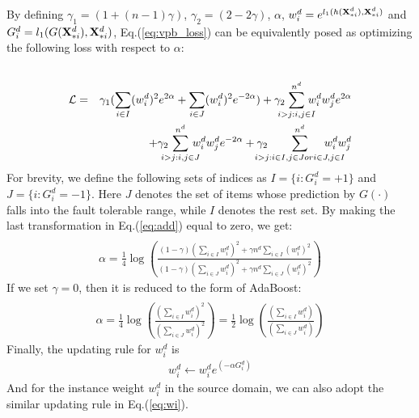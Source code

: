 By defining $\gamma_1=(1+(n-1)\gamma)$, $\gamma_2=(2-2\gamma)$, $\alpha$,
 $w_i^d=e^{l_1(h(\mathbf{X}^d_{*i}),\mathbf{X}^d_{*i})}$ and $G_i^d=l_1(G(\mathbf{X}^d_{*i}),\mathbf{X}^d_{*i})$, Eq.(\ref{eq:vpb_loss}) can be equivalently posed as optimizing the following loss with respect to $\alpha$:
\begin{eqnarray}\label{eq:add}
    \\
    \nonumber
    \Loss
    &=&\gamma_1(\sum_{i\in I} (w_i^d)^2 e^{2\alpha}+\sum_{i\in J} (w_i^d)^2 e^{-2\alpha})+\gamma_2\!\!\!\!\!\sum_{i>j:i,j\in I}^{n^d}\!\!\!\!\! w_i^d w_j^d e^{2\alpha}\\ \nonumber
    & &+\gamma_2\!\!\!\!\!\sum_{i>j:i,j\in J}^{n^d}\!\!\!\!\! w_i^d w_j^d e^{-2\alpha}+\gamma_2\!\!\!\!\!\!\!\!\sum_{i>j:i\in I,j\in J or i\in J, j\in I}^{n^d}\!\!\!\!\!\!\!\!\!\!\!\! w_i^d w_j^d
\end{eqnarray}
For brevity, we define the following sets of indices as $I=\{i:G^d_i=+1\}$ and $J=\{i:G^d_i=-1\}$. Here $J$ denotes the set of items whose prediction by $G(\cdot)$ falls into the fault tolerable range, while $I$ denotes the rest set. By making the last transformation in Eq.(\ref{eq:add}) equal to zero, we get:
\begin{eqnarray}\label{eq:alpha}
    \\
    \nonumber
    \alpha =\frac{1}{4}\log\left(\frac{(1-\gamma)(\sum_{i\in I}w_i^d)^2+\gamma n^d\sum_{i\in I}(w_i^d)^2}{(1-\gamma)(\sum_{i\in J}w_i^d)^2+\gamma n^d\sum_{i\in J}(w_i^d)^2}\right)
\end{eqnarray}
If we set $\gamma=0$, then it is reduced to the form of AdaBoost:
\begin{eqnarray}\label{eq:adaboost_alpha}
    \\
    \nonumber
    \alpha =\frac{1}{4}\log\left(\frac{(\sum_{i\in I}w_i^d)^2}{(\sum_{i\in J}w_i^d)^2}\right)=\frac{1}{2}\log\left(\frac{(\sum_{i\in I}w_i^d)}{(\sum_{i\in J}w_i^d)}\right)
\end{eqnarray}
Finally, the updating rule for $w_i^d$ is
\begin{eqnarray}\label{eq:wi}
    w_i^d \leftarrow w_i^d e^{(-\alpha G_i^d)}
\end{eqnarray}
And for the instance weight $w_i^d$ in the source domain, we can also adopt the similar updating rule in Eq.(\ref{eq:wi}).

